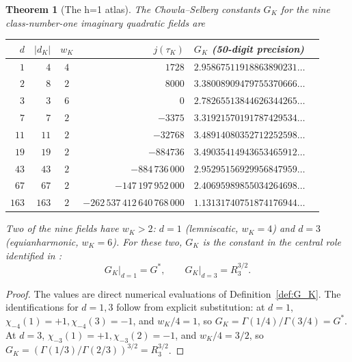 \documentclass[11pt]{amsart}
\theoremstyle{plain}
\newtheorem{theorem}{Theorem}[section]
\theoremstyle{definition}
\theoremstyle{remark}
\newcommand{\Gs}{G^{*}}
\newcommand{\GK}{G_{K}}
\begin{document}
\begin{theorem}[The h=1 atlas]\label{thm:atlas}
The Chowla--Selberg constants $\GK$ for the nine class-number-one
imaginary quadratic fields are
\begin{center}
\begin{tabular}{rrcrlc}
\toprule
$d$ & $|d_K|$ & $w_K$ & $j(\tau_K)$ & $\GK$ (50-digit precision) \\
\midrule
$1$   & $4$   & $4$ & $1728$                          & $2.95867511918863890231\ldots$ \\
$2$   & $8$   & $2$ & $8000$                          & $3.38008909479755370666\ldots$ \\
$3$   & $3$   & $6$ & $0$                             & $2.78265513844626344265\ldots$ \\
$7$   & $7$   & $2$ & $-3375$                         & $3.31921570191787429534\ldots$ \\
$11$  & $11$  & $2$ & $-32768$                        & $3.48914080352712252598\ldots$ \\
$19$  & $19$  & $2$ & $-884736$                       & $3.49035414943653465912\ldots$ \\
$43$  & $43$  & $2$ & $-884\,736\,000$                & $2.95295156929956847959\ldots$ \\
$67$  & $67$  & $2$ & $-147\,197\,952\,000$           & $2.40695989855034264698\ldots$ \\
$163$ & $163$ & $2$ & $-262\,537\,412\,640\,768\,000$ & $1.13131740751874176944\ldots$ \\
\bottomrule
\end{tabular}
\end{center}
Two of the nine fields have $w_K > 2$: $d = 1$ (lemniscatic, $w_K = 4$)
and $d = 3$ (equianharmonic, $w_K = 6$). For these two, $\GK$ is the
constant in the central role identified in \cite[\S 16]{paper-gstar-A}:
\[
\GK\big|_{d=1} = \Gs, \qquad
\GK\big|_{d=3} = R_3^{3/2}.
\]
\end{theorem}

\begin{proof}
The values are direct numerical evaluations of Definition~\ref{def:G_K}.
The identifications for $d = 1, 3$ follow from explicit substitution: at
$d = 1$, $\chi_{-4}(1) = +1, \chi_{-4}(3) = -1$, and $w_K/4 = 1$, so
$\GK = \Gamma(1/4)/\Gamma(3/4) = \Gs$. At $d = 3$,
$\chi_{-3}(1) = +1, \chi_{-3}(2) = -1$, and $w_K/4 = 3/2$, so
$\GK = (\Gamma(1/3)/\Gamma(2/3))^{3/2} = R_{3}^{3/2}$.
\end{proof}
\end{document}
